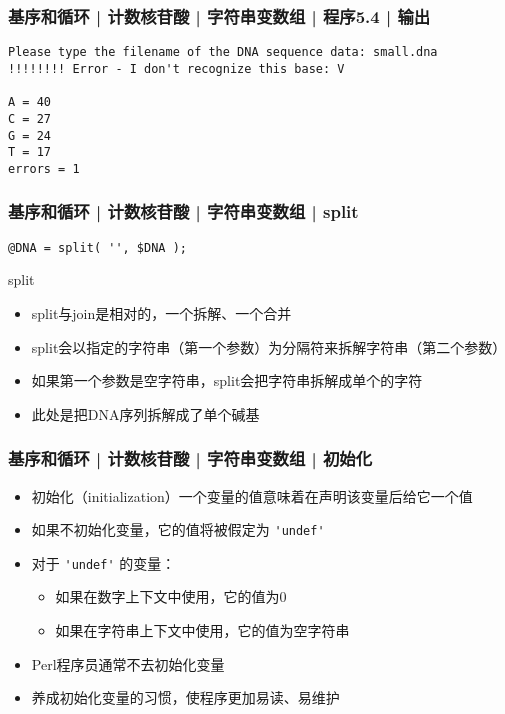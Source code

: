 \begin{frame}[fragile]
  \frametitle{基序和循环 | 计数核苷酸 | 字符串变数组 | 程序5.4 | 输出}
\begin{lstlisting}
Please type the filename of the DNA sequence data: small.dna
!!!!!!!! Error - I don't recognize this base: V

A = 40
C = 27
G = 24
T = 17
errors = 1
\end{lstlisting}
\end{frame}

\begin{frame}[fragile]
  \frametitle{基序和循环 | 计数核苷酸 | 字符串变数组 | \alert{split}}
\begin{lstlisting}
@DNA = split( '', $DNA );
\end{lstlisting}
\pause
\begin{block}{split}
  \begin{itemize}
    \item split与join是相对的，一个拆解、一个合并
    \item split会以指定的字符串（第一个参数）为分隔符来拆解字符串（第二个参数）
    \item 如果第一个参数是空字符串，split会把字符串拆解成单个的字符
    \item 此处是把DNA序列拆解成了单个碱基
  \end{itemize}
\end{block}
\end{frame}

\begin{frame}[fragile]
  \frametitle{基序和循环 | 计数核苷酸 | 字符串变数组 | \alert{初始化}}
  \begin{itemize}
    \item 初始化（initialization）一个变量的值意味着在声明该变量后给它一个值
    \item 如果不初始化变量，它的值将被假定为 \verb|'undef'|
    \item 对于 \verb|'undef'| 的变量：
      \begin{itemize}
	\item 如果在数字上下文中使用，它的值为0
	\item 如果在字符串上下文中使用，它的值为空字符串
      \end{itemize}
    \item Perl程序员通常不去初始化变量
    \item 养成初始化变量的习惯，使程序更加易读、易维护
  \end{itemize}
\end{frame}

